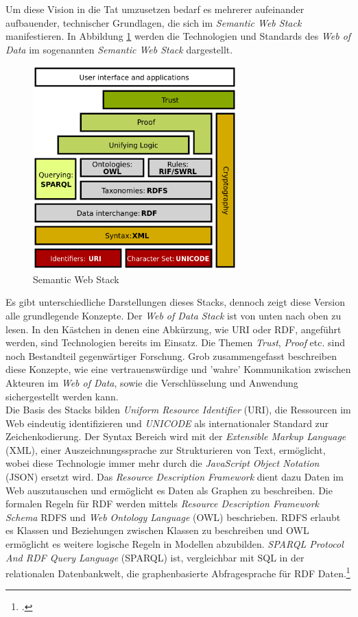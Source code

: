 \documentclass[12pt,a4paper]{article}
\begin{document}
Um diese Vision in die Tat umzusetzen bedarf es mehrerer aufeinander aufbauender, technischer Grundlagen, die sich im \textit{Semantic Web Stack} manifestieren.
In Abbildung \ref{fig:webstack} werden die Technologien und Standards des \textit{Web of Data} im sogenannten \textit{Semantic Web Stack} dargestellt.
\begin{figure}[h]
  \centering
	\includegraphics[width=0.7\textwidth]{img/web_stack.png}  
    \caption[Semantic Web Stack, \protect\url{https://en.wikipedia.org/wiki/Semantic_Web_Stack}, 29.12.2019.]{Semantic Web Stack}
  	\label{fig:webstack}
\end{figure}
Es gibt unterschiedliche Darstellungen dieses Stacks, dennoch zeigt diese Version alle grundlegende Konzepte. Der \textit{Web of Data Stack} ist von unten nach oben zu lesen. In den Kästchen in denen eine Abkürzung, wie URI oder RDF, angeführt werden, sind Technologien bereits im Einsatz. Die Themen \textit{Trust}, \textit{Proof} etc. sind noch Bestandteil gegenwärtiger Forschung. Grob zusammengefasst beschreiben diese Konzepte, wie eine vertrauenswürdige und 'wahre' Kommunikation zwischen Akteuren im \textit{Web of Data}, sowie die Verschlüsselung und Anwendung sichergestellt werden kann. 
\\
Die Basis des Stacks bilden \textit{Uniform Resource Identifier} (URI), die Ressourcen im Web eindeutig identifizieren und \textit{UNICODE} als internationaler Standard zur Zeichenkodierung. Der Syntax Bereich wird mit der \textit{Extensible Markup Language} (XML), einer Auszeichnungssprache zur Strukturieren von Text, ermöglicht, wobei diese Technologie immer mehr durch die \textit{JavaScript Object Notation} (JSON) ersetzt wird. Das \textit{Resource Description Framework} dient dazu Daten im Web auszutauschen und ermöglicht es Daten als Graphen zu beschreiben. Die formalen Regeln für RDF werden mittels \textit{Resource Description Framework Schema} RDFS und \textit{Web Ontology Language} (OWL) beschrieben. RDFS erlaubt es Klassen und Beziehungen zwischen Klassen zu beschreiben und OWL ermöglicht es weitere logische Regeln in Modellen abzubilden. \textit{SPARQL Protocol And RDF Query Language} (SPARQL) ist, vergleichbar mit SQL in der relationalen Datenbankwelt, die graphenbasierte Abfragesprache für RDF Daten.\footcite[][]{horrocks2005semantic}
\end{document}
